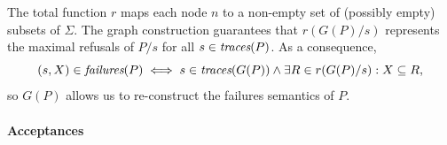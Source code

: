 The total function $r$ maps each node $n$ to a non-empty set of  (possibly
empty) subsets of $\Sigma$. The graph construction guarantees that
$r(G(P)/s)$ represents the maximal refusals of $P/s$ for all $s\in\text{\it traces}(P)$.
As a consequence,
\begin{equation}\label{eq:refsAndR}
(s,X)\in\text{\it failures}(P) \iff s\in\text{\it traces}(G(P)) \wedge \exists R\in r(G(P)/s): X\subseteq R,
\end{equation}
so $G(P)$ allows us to re-construct the failures semantics of $P$.


\paragraph{Acceptances} \label{sec:accs}

